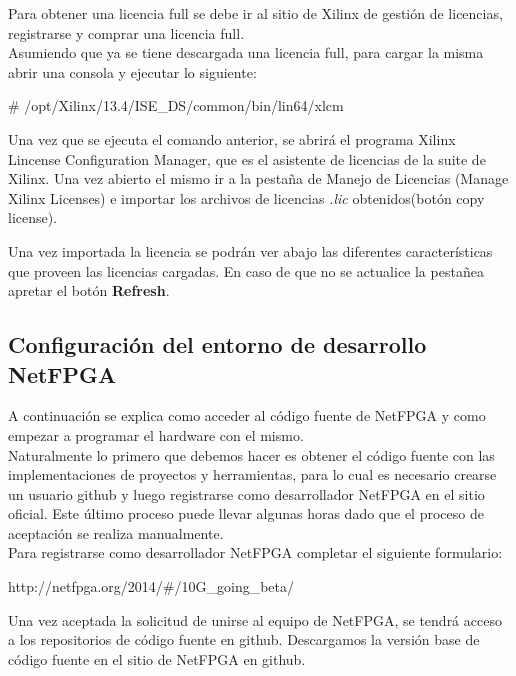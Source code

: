 Para obtener una licencia full se debe ir al sitio de Xilinx de gestión de licencias, registrarse y comprar una licencia full.\\

Asumiendo que ya se tiene descargada una licencia full, para cargar la misma abrir una consola y ejecutar lo siguiente:\\

\begin{bash}
# /opt/Xilinx/13.4/ISE_DS/common/bin/lin64/xlcm
\end{bash}

Una vez que se ejecuta el comando anterior, se abrirá el programa  Xilinx Lincense Configuration Manager, que es el asistente de licencias de la suite de Xilinx. Una vez abierto el mismo ir a la pestaña de Manejo de Licencias (Manage Xilinx Licenses) e importar los archivos de licencias \emph{.lic} obtenidos(botón copy license).

Una vez importada la licencia se podrán ver abajo las diferentes características que proveen las licencias cargadas. En caso de que no se actualice la pestañea apretar el botón \textbf{Refresh}.


\subsection{Configuración del entorno de desarrollo NetFPGA}
A continuación se explica como acceder al código fuente de NetFPGA y como empezar a programar el hardware con el mismo.\\

Naturalmente lo primero que debemos hacer es obtener el código fuente con las implementaciones de proyectos y herramientas, para lo cual es necesario crearse un usuario github y luego registrarse como desarrollador NetFPGA en el sitio oficial. Este último proceso puede llevar algunas horas dado que el proceso de aceptación se realiza manualmente.\\

Para registrarse como desarrollador NetFPGA completar el siguiente formulario:

\begin{center}
http://netfpga.org/2014/\#/10G\_going\_beta/
\end{center}

Una vez aceptada la solicitud de unirse al equipo de NetFPGA, se tendrá acceso a los repositorios de código fuente en github. Descargamos la versión base de código fuente en el sitio de NetFPGA en github.

